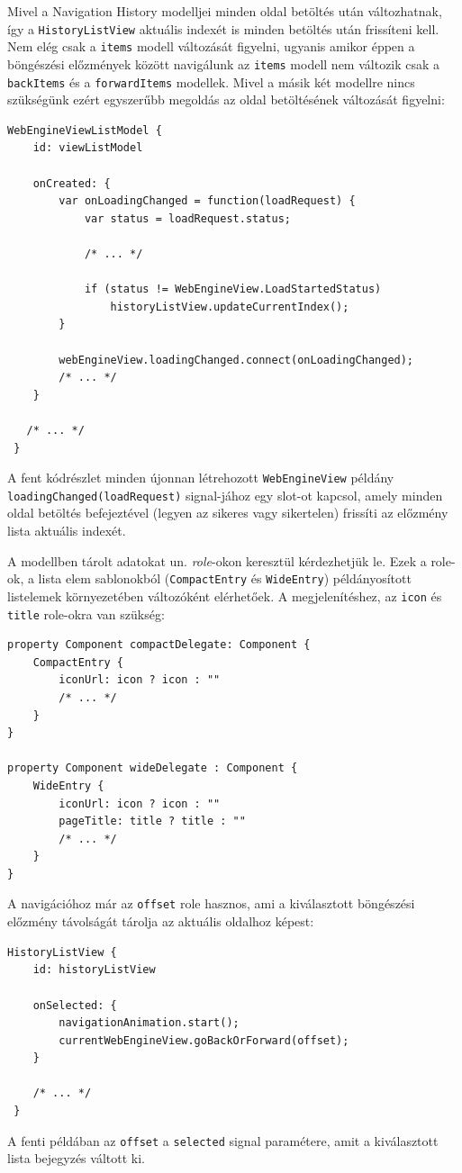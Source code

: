 \documentclass[12pt]{report}
\begin{document}
Mivel a Navigation History modelljei minden oldal betöltés után változhatnak, így a
\texttt{HistoryListView} aktuális indexét is minden betöltés után frissíteni kell. Nem elég
csak a \texttt{items} modell változását figyelni, ugyanis amikor éppen a böngészési előzmények
között navigálunk az \texttt{items} modell nem változik csak a \texttt{backItems} és a
\texttt{forwardItems} modellek. Mivel a másik két modellre nincs szükségünk ezért egyszerűbb
megoldás az oldal betöltésének változását figyelni:
\newpage
\begin{lstlisting}[title=main.qml]
 WebEngineViewListModel {
    id: viewListModel

    onCreated: {
        var onLoadingChanged = function(loadRequest) {
            var status = loadRequest.status;

            /* ... */

            if (status != WebEngineView.LoadStartedStatus)
                historyListView.updateCurrentIndex();
        }

        webEngineView.loadingChanged.connect(onLoadingChanged);
        /* ... */
    }

   /* ... */
 }
\end{lstlisting}
A fent kódrészlet minden újonnan létrehozott \texttt{WebEngineView} példány
\texttt{loadingChanged(loadRequest)} signal-jához egy slot-ot kapcsol, amely minden oldal
betöltés befejeztével (legyen az sikeres vagy sikertelen) frissíti az előzmény lista
aktuális indexét.

A modellben tárolt adatokat un. \textit{role}-okon keresztül kérdezhetjük le. Ezek a role-ok,
a lista elem sablonokból (\texttt{CompactEntry} és \texttt{WideEntry}) példányosított
listelemek környezetében változóként elérhetőek. A megjelenítéshez, az \texttt{icon} és
\texttt{title} role-okra van szükség:
\begin{lstlisting}[title=views/HistoryListView.qml]
property Component compactDelegate: Component {
    CompactEntry {
        iconUrl: icon ? icon : ""
        /* ... */
    }
}

property Component wideDelegate : Component {
    WideEntry {
        iconUrl: icon ? icon : ""
        pageTitle: title ? title : ""
        /* ... */
    }
}
\end{lstlisting}
A navigációhoz már az \texttt{offset} role hasznos, ami a kiválasztott böngészési előzmény
távolságát tárolja az aktuális oldalhoz képest:
\begin{lstlisting}[title=main.qml]
 HistoryListView {
    id: historyListView

    onSelected: {
        navigationAnimation.start();
        currentWebEngineView.goBackOrForward(offset);
    }

    /* ... */
 }
\end{lstlisting}
A fenti példában az \texttt{offset} a \texttt{selected} signal paramétere, amit a kiválasztott
lista bejegyzés váltott ki.
\end{document}
